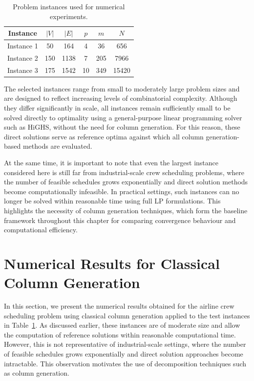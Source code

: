 \documentclass{book}
\theoremstyle{definition}
\numberwithin{algorithm_}{chapter}
\begin{document}
{\begin{table}[ht]
\begin{tabular}{c c c c c c}
\hline
Instance & $|V|$ & $|E|$ & $p$ & $m$ & $N$ \\
\hline
Instance 1 & 50 & 164 & 4 & 36 & 656 \\
Instance 2 & 150 & 1138 & 7 & 205 & 7966 \\
Instance 3 & 175 & 1542 & 10 & 349 & 15420 \\
\hline
\end{tabular}

\caption{Problem instances used for numerical experiments.}
\label{tab:instances}
\end{table}

The selected instances range from small to moderately large problem sizes and are designed to reflect increasing levels of combinatorial complexity. Although they differ significantly in scale, all instances remain sufficiently small to be solved directly to optimality using a general-purpose linear programming solver such as HiGHS, without the need for column generation. For this reason, these direct solutions serve as reference optima against which all column generation-based methods are evaluated.

\bigskip

At the same time, it is important to note that even the largest instance considered here is still far from industrial-scale crew scheduling problems, where the number of feasible schedules grows exponentially and direct solution methods become computationally infeasible. In practical settings, such instances can no longer be solved within reasonable time using full LP formulations. This highlights the necessity of column generation techniques, which form the baseline framework throughout this chapter for comparing convergence behaviour and computational efficiency.



\section{Numerical Results for Classical Column Generation}

In this section, we present the numerical results obtained for the airline crew scheduling problem using classical column generation applied to the test instances in Table~\ref{tab:instances}. As discussed earlier, these instances are of moderate size and allow the computation of reference solutions within reasonable computational time. However, this is not representative of industrial-scale settings, where the number of feasible schedules grows exponentially and direct solution approaches become intractable. This observation motivates the use of decomposition techniques such as column generation.

}
\end{document}
